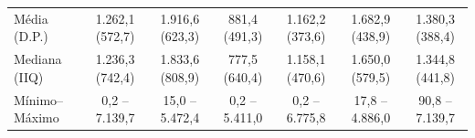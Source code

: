 \begin{table}[!h]
{\begin{tabular}[t]{lcccccc}
\hspace{1em}Média (D.P.) & 1.262,1 (572,7) & 1.916,6 (623,3) & 881,4 (491,3) & 1.162,2 (373,6) & 1.682,9 (438,9) & 1.380,3 (388,4)\\
\hspace{1em}Mediana (IIQ) & 1.236,3 (742,4) & 1.833,6 (808,9) & 777,5 (640,4) & 1.158,1 (470,6) & 1.650,0 (579,5) & 1.344,8 (441,8)\\
\hspace{1em}Mínimo–Máximo & 0,2 – 7.139,7 & 15,0 – 5.472,4 & 0,2 – 5.411,0 & 0,2 – 6.775,8 & 17,8 – 4.886,0 & 90,8 – 7.139,7\\
\bottomrule
\end{tabular}}
\end{table}
